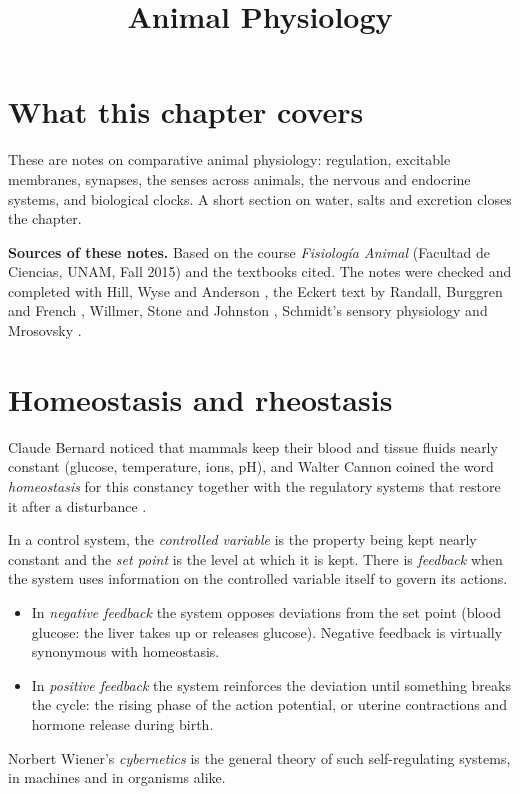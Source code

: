 



\title{Animal Physiology}
\maketitle

\label{section-phantom}

\tableofcontents

\section{What this chapter covers}
\label{section-overview}

These are notes on comparative animal
physiology: regulation, excitable
membranes, synapses, the senses across
animals, the nervous and endocrine
systems, and biological clocks. A short
section on water, salts and excretion
closes the chapter.

\textbf{Sources of these notes.}
Based on the course
\emph{Fisiolog\'ia Animal}
(Facultad de Ciencias, UNAM, Fall 2015)
and the textbooks cited. The notes
were checked and completed with Hill,
Wyse and Anderson
\cite{hill2012animal}, the Eckert text by
Randall, Burggren and French
\cite{randall1997eckert}, Willmer, Stone
and Johnston \cite{willmer2005environmental},
Schmidt's sensory physiology
\cite{schmidt1981sensory} and Mrosovsky
\cite{mrosovsky1990rheostasis}.

\section{Homeostasis and rheostasis}
\label{section-homeostasis}

Claude Bernard noticed that mammals keep
their blood and tissue fluids nearly
constant (glucose, temperature, ions,
pH), and Walter Cannon coined the word
\emph{homeostasis} for this constancy
together with the regulatory systems that
restore it after a disturbance
\cite[Chapter 1]{hill2012animal}.

In a control system, the \emph{controlled
variable} is the property being kept
nearly constant and the \emph{set point}
is the level at which it is kept. There
is \emph{feedback} when the system uses
information on the controlled variable
itself to govern its actions.
\begin{itemize}
\item In \emph{negative feedback} the
system opposes deviations from the set
point (blood glucose: the liver takes up
or releases glucose). Negative feedback
is virtually synonymous with homeostasis.
\item In \emph{positive feedback} the
system reinforces the deviation until
something breaks the cycle: the rising
phase of the action potential, or
uterine contractions and hormone release
during birth.
\end{itemize}
Norbert Wiener's \emph{cybernetics} is the
general theory of such self-regulating
systems, in machines and in organisms
alike.

